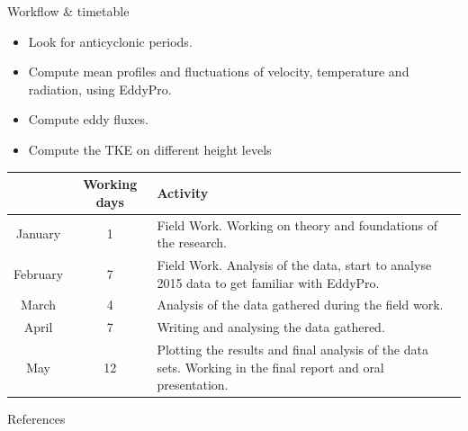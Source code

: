 \documentclass{beamer}
\begin{document}
\begin{frame}{Workflow \& timetable}

\begin{itemize}
    \item Look for anticyclonic periods.
    \item Compute mean profiles and fluctuations of velocity, temperature and radiation, using EddyPro.
    \item Compute eddy fluxes.
\item Compute the TKE on different height levels
\end{itemize}

\begin{table}[ht!]
\scriptsize
\begin{center}
\begin{tabular}{|c|c|p{6cm}|}
\hline
  & \textbf{Working days} & \textbf{Activity} \\
\hline
January & 1 & Field Work. Working on theory and foundations of the research.\\
\hline
February & 7 & Field Work. Analysis of the data, start to analyse 2015 data to get familiar with EddyPro.\\
\hline
March & 4 & Analysis of the data gathered during the field work.\\
\hline
April & 7 & Writing and analysing the data gathered.\\
\hline
May & 12 & Plotting the results and final analysis of the data sets. Working in the final report and oral presentation.\\
\hline
\end{tabular}

\label{table:schedule}
\end{center}
\end{table}


\end{frame}


\begin{frame}[allowframebreaks]{References}%
    \footnotesize
    
    \nocite{*}
    

\end{frame}
\end{document}
